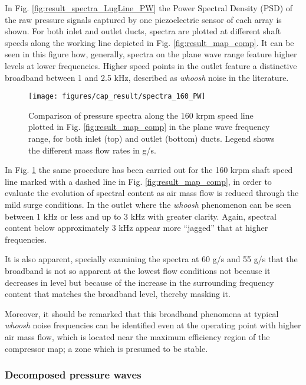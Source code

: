In Fig. \ref{fig:result_spectra_LugLine_PW} the Power Spectral Density (PSD) of the raw pressure signals captured by one piezoelectric sensor of each array is shown. For both inlet and outlet ducts, spectra are plotted at different shaft speeds along the working line depicted in Fig. \ref{fig:result_map_comp}. It can be seen in this figure how, generally, spectra on the plane wave range feature higher levels at lower frequencies. Higher speed points in the outlet feature a distinctive broadband between 1 and 2.5 kHz, described as \emph{whoosh} noise in the literature.

\begin{figure}[tbh!]
\centering
\texttt{[image: figures/cap\_result/spectra\_160\_PW]}
\caption{Comparison of pressure spectra along the 160 krpm speed line plotted in Fig. \ref{fig:result_map_comp} in the plane wave frequency range, for both inlet (top) and outlet (bottom) ducts. Legend shows the different mass flow rates in g/s.}
\label{fig:result_spectra_60_PW}
\end{figure}

In Fig. \ref{fig:result_spectra_60_PW} the same procedure has been carried out for the 160 krpm shaft speed line marked with a dashed line in Fig. \ref{fig:result_map_comp}, in order to evaluate the evolution of spectral content as air mass flow is reduced through the mild surge conditions. In the outlet where the \emph{whoosh} phenomenon can be seen between 1 kHz or less and up to 3 kHz with greater clarity. Again, spectral content below approximately 3 kHz appear more ``jagged'' that at higher frequencies.

It is also apparent, specially examining the spectra at 60 g/s and 55 g/s that the broadband is not so apparent at the lowest flow conditions not because it decreases in level but because of the increase in the surrounding frequency content that matches the broadband level, thereby masking it. 

Moreover, it should be remarked that this broadband phenomena at typical \emph{whoosh} noise frequencies can be identified even at the operating point with higher air mass flow, which is located near the maximum efficiency region of the compressor map; a zone which is presumed to be stable.

\subsubsection{Decomposed pressure waves}

